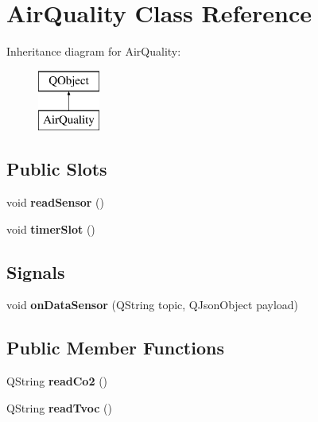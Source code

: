 \hypertarget{classAirQuality}{}\section{Air\+Quality Class Reference}
\label{classAirQuality}
Inheritance diagram for Air\+Quality\+:\begin{figure}[H]
\begin{center}
\leavevmode
\includegraphics[height=2.000000cm]{classAirQuality}
\end{center}
\end{figure}
\subsection*{Public Slots}
\begin{DoxyCompactItemize}
\item 
\mbox{\label{classAirQuality_a16c9cfb7cb19bc6eabbbede97f2cb125}} 
void {\bfseries read\+Sensor} ()
\item 
\mbox{\label{classAirQuality_ac34f79a7f17b82dc19e584d3b5f0425e}} 
void {\bfseries timer\+Slot} ()
\end{DoxyCompactItemize}
\subsection*{Signals}
\begin{DoxyCompactItemize}
\item 
\mbox{\label{classAirQuality_a1109f52aee3643b1ef0bef0f3df5870f}} 
void {\bfseries on\+Data\+Sensor} (Q\+String topic, Q\+Json\+Object payload)
\end{DoxyCompactItemize}
\subsection*{Public Member Functions}
\begin{DoxyCompactItemize}
\item 
\mbox{\label{classAirQuality_a780c19f099ebc69346ca85557372d7e3}} 
Q\+String {\bfseries read\+Co2} ()
\item 
\mbox{\label{classAirQuality_abf89a765a16eebf241db36cefeb82a7d}} 
Q\+String {\bfseries read\+Tvoc} ()
\end{DoxyCompactItemize}


